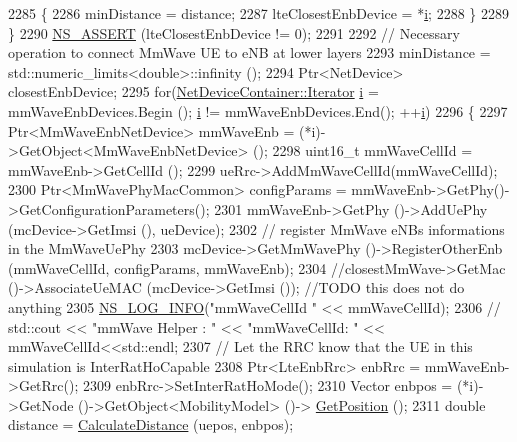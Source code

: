 \begin{DoxyCode}
2285             \{
2286               minDistance = distance;
2287               lteClosestEnbDevice = *\hyperlink{bernuolliDistribution_8m_a6f6ccfcf58b31cb6412107d9d5281426}{i};
2288             \}
2289         \}
2290         \hyperlink{assert_8h_a6dccdb0de9b252f60088ce281c49d052}{NS\_ASSERT} (lteClosestEnbDevice != 0);
2291 
2292         \textcolor{comment}{// Necessary operation to connect MmWave UE to eNB at lower layers}
2293         minDistance = std::numeric\_limits<double>::infinity ();
2294         Ptr<NetDevice> closestEnbDevice;
2295         \textcolor{keywordflow}{for}(\hyperlink{classns3_1_1NetDeviceContainer_a45709bb572f975569ed985fa89b132f8}{NetDeviceContainer::Iterator} \hyperlink{bernuolliDistribution_8m_a6f6ccfcf58b31cb6412107d9d5281426}{i} = mmWaveEnbDevices.Begin (); 
      \hyperlink{bernuolliDistribution_8m_a6f6ccfcf58b31cb6412107d9d5281426}{i} != mmWaveEnbDevices.End(); ++\hyperlink{bernuolliDistribution_8m_a6f6ccfcf58b31cb6412107d9d5281426}{i})
2296         \{
2297                 Ptr<MmWaveEnbNetDevice> mmWaveEnb = (*i)->GetObject<MmWaveEnbNetDevice> (); 
2298                 uint16\_t mmWaveCellId = mmWaveEnb->GetCellId ();
2299                 ueRrc->AddMmWaveCellId(mmWaveCellId);
2300                 Ptr<MmWavePhyMacCommon> configParams = mmWaveEnb->GetPhy()->GetConfigurationParameters();
2301                 mmWaveEnb->GetPhy ()->AddUePhy (mcDevice->GetImsi (), ueDevice);
2302                 \textcolor{comment}{// register MmWave eNBs informations in the MmWaveUePhy}
2303                 mcDevice->GetMmWavePhy ()->RegisterOtherEnb (mmWaveCellId, configParams, mmWaveEnb);
2304                 \textcolor{comment}{//closestMmWave->GetMac ()->AssociateUeMAC (mcDevice->GetImsi ()); //TODO this does not do
       anything}
2305                 \hyperlink{group__logging_gafbd73ee2cf9f26b319f49086d8e860fb}{NS\_LOG\_INFO}(\textcolor{stringliteral}{"mmWaveCellId "} << mmWaveCellId);
2306         \textcolor{comment}{//      std::cout  << "mmWave Helper : " << "mmWaveCellId: " << mmWaveCellId<<std::endl;}
2307                 \textcolor{comment}{// Let the RRC know that the UE in this simulation is InterRatHoCapable}
2308                 Ptr<LteEnbRrc> enbRrc = mmWaveEnb->GetRrc();
2309                 enbRrc->SetInterRatHoMode();
2310                 Vector enbpos = (*i)->GetNode ()->GetObject<MobilityModel> ()->
      \hyperlink{lena-cqi-threshold_8cc_acebf763e1a0478cec225f9547941ae54}{GetPosition} ();
2311             \textcolor{keywordtype}{double} distance = \hyperlink{namespacens3_aaae60adf695e280c4882ced6041d1628}{CalculateDistance} (uepos, enbpos);

\end{DoxyCode}
